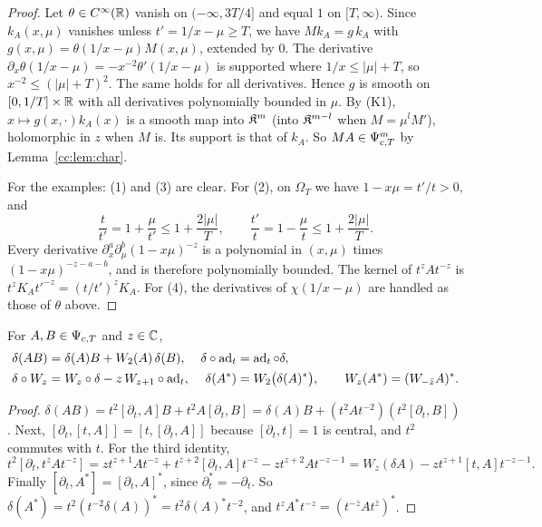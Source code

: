 \begin{proof}
Let \(\theta\in C^\infty(\mathbb R)\) vanish on \((-\infty,3T/4]\) and equal \(1\) on
\([T,\infty)\). Since \(k_A(x,\mu)\) vanishes unless \(t'=1/x-\mu\ge T\),
we have \(Mk_A=g\,k_A\) with \(g(x,\mu)=\theta(1/x-\mu)M(x,\mu)\), extended
by \(0\). The derivative \(\partial_x\theta(1/x-\mu)=
-x^{-2}\theta'(1/x-\mu)\) is supported where \(1/x\le|\mu|+T\), so
\(x^{-2}\le(|\mu|+T)^2\). The same holds for all derivatives. Hence \(g\)
is smooth on \([0,1/T]\times\mathbb R\) with all derivatives polynomially bounded
in \(\mu\). By (K1), \(x\mapsto g(x,\cdot)k_A(x)\) is a smooth map into
\(\mathfrak K^m\) (into \(\mathfrak K^{m-l}\) when \(M=\mu^lM'\)), holomorphic in \(z\)
when \(M\) is. Its support is that of \(k_A\). So \(MA\in\Psi_{c,T}^m\) by
Lemma~\ref{cc:lem:char}.

For the examples: (1) and (3) are clear. For (2), on \(\Omega_T\) we have
\(1-x\mu=t'/t>0\), and
\[
 \frac t{t'}=1+\frac\mu{t'}\le1+\frac{2|\mu|}T,\qquad
 \frac{t'}t=1-\frac\mu t\le1+\frac{2|\mu|}T .
\]
Every derivative \(\partial_x^a\partial_\mu^b(1-x\mu)^{-z}\) is a
polynomial in \((x,\mu)\) times \((1-x\mu)^{-z-a-b}\), and is therefore
polynomially bounded. The kernel of \(t^zAt^{-z}\) is
\(t^zK_At'^{-z}=(t/t')^zK_A\). For (4), the derivatives of
\(\chi(1/x-\mu)\) are handled as those of \(\theta\) above.
\end{proof}

\begin{lemma}\label{cc:lem:identities}
For \(A,B\in\Psi_{c,T}\) and \(z\in\mathbb C\),
\begin{align*}
 \delta(AB)&=\delta(A)B+W_2(A)\,\delta(B), &
 \delta\circ\operatorname{ad}_t&=\operatorname{ad}_t\circ\delta,\\
 \delta\circ W_z&=W_z\circ\delta-z\,W_{z+1}\circ\operatorname{ad}_t, &
 \delta(A^*)&=W_2\bigl(\delta(A)^*\bigr),\qquad W_z(A^*)=(W_{-\bar z}A)^* .
\end{align*}
\end{lemma}

\begin{proof}
\(\delta(AB)=t^2[\partial_t,A]B+t^2A[\partial_t,B]=\delta(A)B+
(t^2At^{-2})(t^2[\partial_t,B])\). Next,
\([\partial_t,[t,A]]=[t,[\partial_t,A]]\) because \([\partial_t,t]=1\) is
central, and \(t^2\) commutes with \(t\). For the third identity,
\[
 t^2[\partial_t,t^zAt^{-z}]=zt^{z+1}At^{-z}+t^{z+2}[\partial_t,A]t^{-z}
 -zt^{z+2}At^{-z-1}=W_z(\delta A)-zt^{z+1}[t,A]t^{-z-1} .
\]
Finally \([\partial_t,A^*]=[\partial_t,A]^*\), since \(\partial_t^*=
-\partial_t\). So \(\delta(A^*)=t^2(t^{-2}\delta(A))^*=
t^2\delta(A)^*t^{-2}\), and \(t^zA^*t^{-z}=(t^{-\bar z}At^{\bar z})^*\).
\end{proof}

